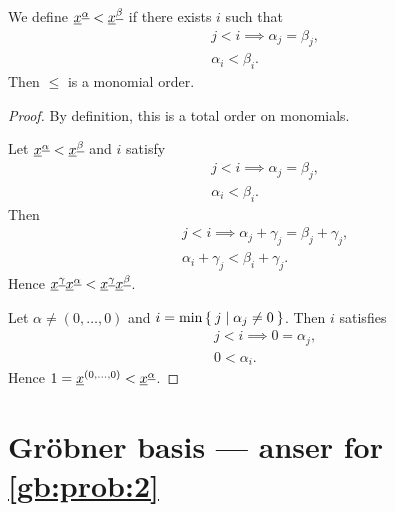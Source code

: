 \begin{example}
  We define ${\underline{x}}^{\underline{\alpha}} < {\underline{x}}^{\underline{\beta}} $
  if there exists $i$ such that
  \begin{align*}
    &j<i\implies \alpha_j=\beta_j,\\
    &\alpha_i < \beta_i.
  \end{align*}
  Then $\leq$ is a monomial order.
\end{example}
\begin{proof}
  By definition,
  this is a total order on monomials.

  Let ${\underline{x}}^{\underline{\alpha}} < {\underline{x}}^{\underline{\beta}}$ and
   $i$ satisfy
  \begin{align*}
    &j<i\implies \alpha_j=\beta_j,\\
    &\alpha_i < \beta_i.
  \end{align*}
  Then 
  \begin{align*}
    &j<i\implies \alpha_j+\gamma_j=\beta_j+\gamma_j,\\
    &\alpha_i+\gamma_j < \beta_i+\gamma_j.
  \end{align*}
  Hence $ {\underline{x}}^{\underline{\gamma}}{\underline{x}}^{\underline{\alpha}}< {\underline{x}}^{\underline{\gamma}}{\underline{x}}^{\underline{\beta}}$.


  Let $\alpha\neq (0,\ldots,0)$ and $i=\min\Set{j|\alpha_j\neq 0}$.
  Then
   $i$ satisfies
  \begin{align*}
    &j<i\implies 0=\alpha_j,\\
    &0<\alpha_i.
  \end{align*}
  Hence $1={\underline{x}}^{(0,\ldots,0)} < {\underline{x}}^{\underline{\alpha}}$.
\end{proof}

\section{Gr\"obner basis --- anser for \cref{gb:prob:2}}

